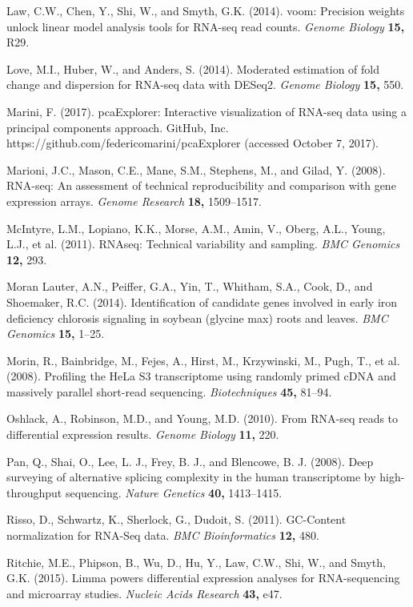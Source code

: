 \documentclass[referee]{biom}
\begin{document}
\begin{thebibliography}{}
\bibitem{ } Law, C.W., Chen, Y., Shi, W., and Smyth, G.K. (2014). voom: Precision weights unlock linear model analysis tools for RNA-seq read counts. \textit{Genome Biology} \textbf{15,} R29.

\bibitem{ } Love, M.I., Huber, W., and Anders, S. (2014). Moderated estimation of fold change and dispersion for RNA-seq data with DESeq2. \textit{Genome Biology} \textbf{15,} 550.

\bibitem{ } Marini, F. (2017). pcaExplorer: Interactive visualization of RNA-seq data using a principal components approach. GitHub, Inc. https://github.com/federicomarini/pcaExplorer (accessed October 7, 2017).

\bibitem{ } Marioni, J.C., Mason, C.E., Mane, S.M., Stephens, M., and Gilad, Y. (2008). RNA-seq: An assessment of technical reproducibility and comparison with gene expression arrays. \textit{Genome Research} \textbf{18,} 1509–1517.

\bibitem{ } McIntyre, L.M., Lopiano, K.K., Morse, A.M., Amin, V., Oberg, A.L., Young, L.J., et al. (2011). RNAseq: Technical variability and sampling. \textit{BMC Genomics} \textbf{12,} 293.

\bibitem{ } Moran Lauter, A.N., Peiffer, G.A., Yin, T., Whitham, S.A., Cook, D., and Shoemaker, R.C. (2014). Identification of candidate genes involved in early iron deficiency chlorosis signaling in soybean (glycine max) roots and leaves. \textit{BMC Genomics} \textbf{15,} 1–25.

\bibitem{ } Morin, R., Bainbridge, M., Fejes, A., Hirst, M., Krzywinski, M., Pugh, T., et al. (2008). Profiling the HeLa S3 transcriptome using randomly primed cDNA and massively parallel short-read sequencing. \textit{Biotechniques} \textbf{45,} 81–94.

\bibitem{ } Oshlack, A., Robinson, M.D., and Young, M.D. (2010). From RNA-seq reads to differential expression results. \textit{Genome Biology} \textbf{11,} 220.

\bibitem{ } Pan, Q., Shai, O., Lee, L. J., Frey, B. J., and Blencowe, B. J. (2008). Deep surveying of alternative splicing complexity in the human transcriptome by high-throughput sequencing. \textit{Nature Genetics} \textbf{40,} 1413–1415.

\bibitem{ } Risso, D., Schwartz, K., Sherlock, G., Dudoit, S. (2011). GC-Content normalization for RNA-Seq data. \textit{BMC Bioinformatics} \textbf{12,} 480.

\bibitem{ } Ritchie, M.E., Phipson, B., Wu, D., Hu, Y., Law, C.W., Shi, W., and Smyth, G.K. (2015). Limma powers differential expression analyses for RNA-sequencing and microarray studies. \textit{Nucleic Acids Research} \textbf{43,} e47.


\end{thebibliography}
\end{document}

